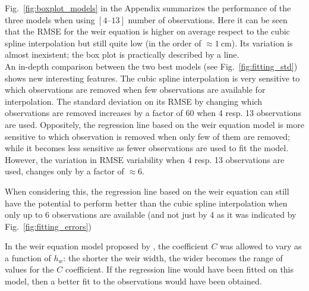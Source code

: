 
Fig.~\ref{fig:boxplot_models} in the Appendix summarizes the performance of the three models when using $[\numrange{4}{13}]$ number of observations.
Here it can be seen that the RMSE for the weir equation is higher on average respect to the cubic spline interpolation but still quite low (in the order of $\approx \SI{1}{\centi\meter}$).
Its variation is almost inexistent; the box plot is practically described by a line.\\

An in-depth comparison between the two best models (see Fig.~\ref{fig:fitting_std}) shows new interesting features.
The cubic spline interpolation is very sensitive to which observations are removed when few observations are available for interpolation. The standard deviation on its RMSE by changing which observations are removed increases by a factor of \num{60} when \num{4} resp. \num{13} observations are used.
Oppositely, the regression line based on the weir equation model is more sensitive to which observation is removed when only few of them are removed; while it becomes less sensitive as fewer observations are used to fit the model. However, the variation in RMSE variability  when \num{4} resp. \num{13} observations are used, changes only by a factor of $\approx \num{6}$.

When considering this, the regression line based on the weir equation can still have the potential to perform better than the cubic spline interpolation when only up to \num{6} observations are available (and not just by \num{4} as it was indicated by Fig.~\ref{fig:fitting_errors})

In the weir equation model proposed by \cite{brown_urban_2009}, the coefficient $C$ was allowed to vary as a function of $h_w$:  the shorter the weir width, the wider becomes the range of values for the $C$ coefficient. If the regression line would have been fitted on this model, then a better fit to the observations would have been obtained.


